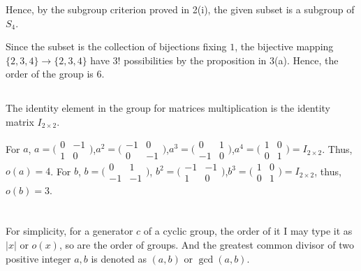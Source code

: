 \documentclass[12pt]{article}
\begin{document}
Hence, by the subgroup criterion proved in 2(i), the given subset is a subgroup of $S_4$.

Since the subset is the collection of bijections fixing $1$, the bijective mapping $\{2,3,4\}\rightarrow\{{2,3,4}\}$ have $3!$ possibilities by the proposition in 3(a). Hence, the order of the group is $6$.
\subsection{} %
The identity element in the group for matrices multiplication is the identity matrix $I_{2\times2}$.

For $a$, $a=\big(\begin{smallmatrix}0 & -1\\1 & 0\end{smallmatrix}\big)$,$a^2=\big(\begin{smallmatrix}-1 & 0\\0 & -1\end{smallmatrix}\big)$,$a^3=\big(\begin{smallmatrix}0 & 1\\-1 & 0\end{smallmatrix}\big)$,$a^4=\big(\begin{smallmatrix}1 & 0\\0 & 1\end{smallmatrix}\big)=I_{2\times2}$. Thus, $o(a)=4$. For $b$, $b=\big(\begin{smallmatrix}0 & 1\\-1 & -1\end{smallmatrix}\big)$, $b^2=\big(\begin{smallmatrix}-1 & -1\\1 & 0\end{smallmatrix}\big)$,$b^3=\big(\begin{smallmatrix}1 & 0\\0 & 1\end{smallmatrix}\big)=I_{2\times2}$, thus, $o(b)=3$.










\newpage
\section{} %
For simplicity, for a generator $c$ of a cyclic group, the order of it I may type it as $|x|$ or $o(x)$, so are the order of groups. And the greatest common divisor of two positive integer $a,b$ is denoted as $(a,b)$ or $\gcd{(a,b)}$.
\end{document}
